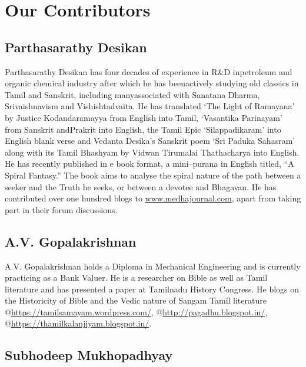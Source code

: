 
\chapter*{Our Contributors }\label{contributors}

\vskip 4pt

\section*{Parthasarathy Desikan}

\vskip 4pt

Parthasarathy Desikan has four decades of experience in R\&D in\break petroleum and organic chemical industry after which he has been\break actively studying old classics in Tamil and Sanskrit, including many\break associated with Sanatana Dharma, Srivaishnavism and Vishishtadvaita. He has translated `The Light of Ramayana' by Justice Kodandaramayya from English into Tamil, `Vasantika Parinayam' from Sanskrit and\break Prakrit into English, the Tamil Epic `Silappadikaram' into English blank verse and Vedanta Desika’s Sanskrit poem `Sri Paduka Sahasram' along with its Tamil Bhashyam by Vidwan Tirumalai Thathacharya into English. He has recently published in e book format, a mini–purana in English titled, “A Spiral Fantasy.” The book aims to analyse the spiral nature of the path between a seeker and the Truth he seeks, or between a devotee and Bhagavan. He has contributed over one hundred blogs to \url{www.medhajournal.com}, apart from taking part in their forum discussions.

\vskip 4pt

\section*{A.V. Gopalakrishnan}

\vskip 4pt

A.V. Gopalakrishnan holds a Diploma in Mechanical Engineering and is currently practicing as a Bank Valuer. He is a researcher on Bible as well as Tamil literature and has presented a paper at Tamilnadu History Congress. He blogs on the Historicity of Bible and the Vedic nature of Sangam Tamil literature @\url{https://tamilsamayam.wordpress.com/}, @\url{http://pagadhu.blogspot.in/}, @\url{https://thamilkalanjiyam.blogspot.in/}.

\section*{Subhodeep Mukhopadhyay}

